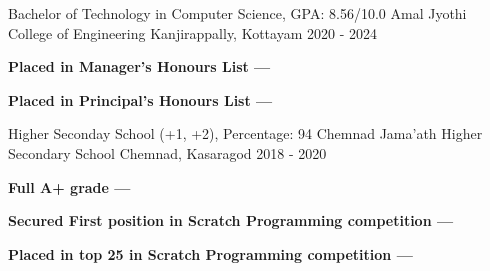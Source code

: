 
\begin{cventries}
  \cventry
    {Bachelor of Technology in Computer Science, GPA: 8.56/10.0} %
    {Amal Jyothi College of Engineering} %
    {Kanjirappally, Kottayam} %
    {2020 - 2024} %
    {
      \begin{cvitems} %
         \item {\textbf{Placed in Manager's Honours List --- }}
         \vspace{0.5mm}
         \item {\textbf{Placed in Principal's Honours List --- }}
      \end{cvitems}
    }
  \vspace{0.5mm}
  \cventry
    {Higher Seconday School (+1, +2), Percentage: 94}
    {Chemnad Jama'ath Higher Secondary School}
    {Chemnad, Kasaragod}
    {2018 - 2020}
    {
      \begin{cvitems} %
         \item {\textbf{Full A+ grade --- }}
         \vspace{0.5mm}
         \item {\textbf{Secured First position in Scratch Programming competition --- }}
         \vspace{0.5mm}
         \item {\textbf{Placed in top 25 in Scratch Programming competition --- }}
      \end{cvitems}
    }
\end{cventries}
